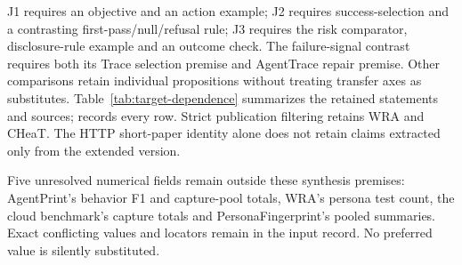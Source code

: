 J1 requires an objective and an action example; J2 requires success-selection and a contrasting first-pass/null/refusal rule; J3 requires the risk comparator, disclosure-rule example and an outcome check. The failure-signal contrast requires both its Trace selection premise and AgentTrace repair premise. Other comparisons retain individual propositions without treating transfer axes as substitutes. Table~\ref{tab:target-dependence} summarizes the retained statements and sources;  records every row. Strict publication filtering retains WRA and CHeaT. The HTTP short-paper identity alone does not retain claims extracted only from the extended version.


Five unresolved numerical fields remain outside these synthesis premises: AgentPrint's behavior F1 and capture-pool totals, WRA's persona test count, the cloud benchmark's capture totals and PersonaFingerprint's pooled summaries. Exact conflicting values and locators remain in the input record. No preferred value is silently substituted.
